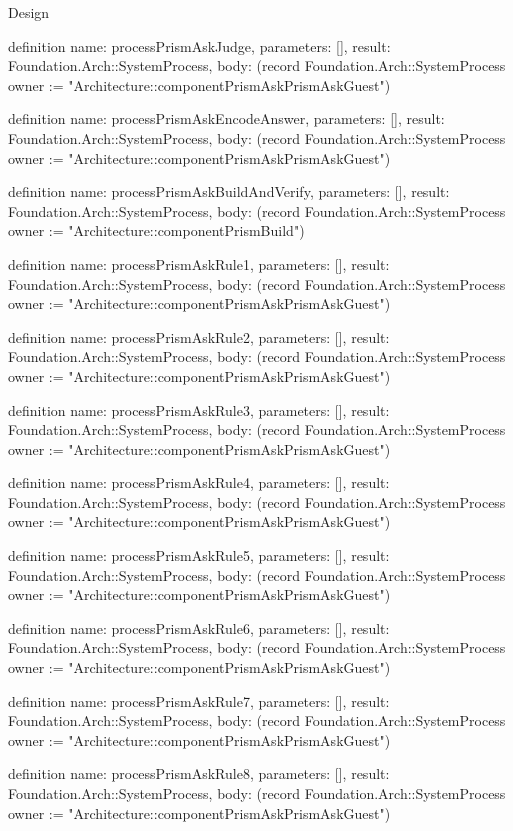 \begin{lexlean}{Design}
\begin{semanticmodule}
definition{
  name: processPrismAskJudge,
  parameters: [],
  result: Foundation.Arch::SystemProcess,
  body: (record Foundation.Arch::SystemProcess {owner := "Architecture::componentPrismAskPrismAskGuest"})
}

definition{
  name: processPrismAskEncodeAnswer,
  parameters: [],
  result: Foundation.Arch::SystemProcess,
  body: (record Foundation.Arch::SystemProcess {owner := "Architecture::componentPrismAskPrismAskGuest"})
}

definition{
  name: processPrismAskBuildAndVerify,
  parameters: [],
  result: Foundation.Arch::SystemProcess,
  body: (record Foundation.Arch::SystemProcess {owner := "Architecture::componentPrismBuild"})
}

definition{
  name: processPrismAskRule1,
  parameters: [],
  result: Foundation.Arch::SystemProcess,
  body: (record Foundation.Arch::SystemProcess {owner := "Architecture::componentPrismAskPrismAskGuest"})
}

definition{
  name: processPrismAskRule2,
  parameters: [],
  result: Foundation.Arch::SystemProcess,
  body: (record Foundation.Arch::SystemProcess {owner := "Architecture::componentPrismAskPrismAskGuest"})
}

definition{
  name: processPrismAskRule3,
  parameters: [],
  result: Foundation.Arch::SystemProcess,
  body: (record Foundation.Arch::SystemProcess {owner := "Architecture::componentPrismAskPrismAskGuest"})
}

definition{
  name: processPrismAskRule4,
  parameters: [],
  result: Foundation.Arch::SystemProcess,
  body: (record Foundation.Arch::SystemProcess {owner := "Architecture::componentPrismAskPrismAskGuest"})
}

definition{
  name: processPrismAskRule5,
  parameters: [],
  result: Foundation.Arch::SystemProcess,
  body: (record Foundation.Arch::SystemProcess {owner := "Architecture::componentPrismAskPrismAskGuest"})
}

definition{
  name: processPrismAskRule6,
  parameters: [],
  result: Foundation.Arch::SystemProcess,
  body: (record Foundation.Arch::SystemProcess {owner := "Architecture::componentPrismAskPrismAskGuest"})
}

definition{
  name: processPrismAskRule7,
  parameters: [],
  result: Foundation.Arch::SystemProcess,
  body: (record Foundation.Arch::SystemProcess {owner := "Architecture::componentPrismAskPrismAskGuest"})
}

definition{
  name: processPrismAskRule8,
  parameters: [],
  result: Foundation.Arch::SystemProcess,
  body: (record Foundation.Arch::SystemProcess {owner := "Architecture::componentPrismAskPrismAskGuest"})
}


\end{semanticmodule}
\end{lexlean}
